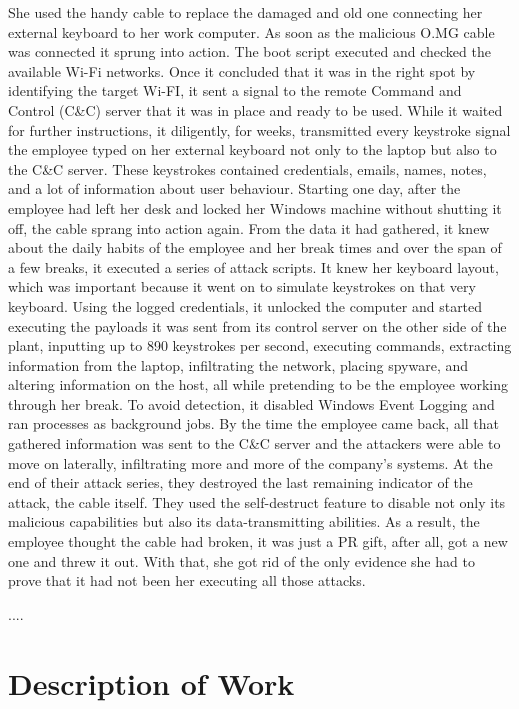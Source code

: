 She used the handy cable to replace the damaged and old one connecting her external keyboard to her work computer. As soon as the malicious O.MG cable was connected it sprung into action. The boot script executed and checked the available Wi-Fi networks. Once it concluded that it was in the right spot by identifying the target Wi-FI, it sent a signal to the remote Command and Control (C\&C) server that it was in place and ready to be used. While it waited for further instructions, it diligently, for weeks, transmitted every keystroke signal the employee typed on her external keyboard not only to the laptop but also to the C\&C server. These keystrokes contained credentials, emails, names, notes, and a lot of information about user behaviour. Starting one day, after the employee had left her desk and locked her Windows machine without shutting it off, the cable sprang into action again. From the data it had gathered, it knew about the daily habits of the employee and her break times and over the span of a few breaks, it executed a series of attack scripts. It knew her keyboard layout, which was important because it went on to simulate keystrokes on that very keyboard. Using the logged credentials, it unlocked the computer and started executing the payloads it was sent from its control server on the other side of the plant, inputting up to 890 keystrokes per second, executing commands, extracting information from the laptop, infiltrating the network, placing spyware, and altering information on the host, all while pretending to be the employee working through her break. To avoid detection, it disabled Windows Event Logging and ran processes as background jobs. By the time the employee came back, all that gathered information was sent to the C\&C server and the attackers were able to move on laterally, infiltrating more and more of the company's systems. At the end of their attack series, they destroyed the last remaining indicator of the attack, the cable itself. They used the self-destruct feature to disable not only its malicious capabilities but also its data-transmitting abilities. As a result, the employee thought the cable had broken, it was just a PR gift, after all, got a new one and threw it out. With that, she got rid of the only evidence she had to prove that it had not been her executing all those attacks.

....

\section{Description of Work}

